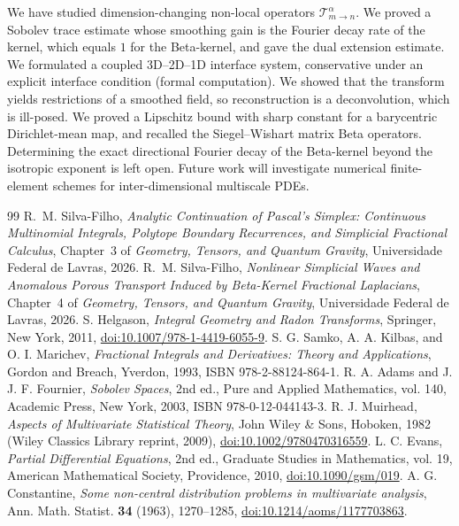 \documentclass[11pt,a4paper]{article}
\theoremstyle{plain}
\theoremstyle{definition}
\theoremstyle{remark}
\numberwithin{equation}{section}
\begin{document}
We have studied dimension-changing non-local operators $\mathcal{T}_{m \to n}^\alpha$. We proved a Sobolev trace estimate whose smoothing gain is the Fourier decay rate of the kernel, which equals $1$ for the Beta-kernel, and gave the dual extension estimate. We formulated a coupled 3D--2D--1D interface system, conservative under an explicit interface condition (formal computation). We showed that the transform yields restrictions of a smoothed field, so reconstruction is a deconvolution, which is ill-posed. We proved a Lipschitz bound with sharp constant for a barycentric Dirichlet-mean map, and recalled the Siegel--Wishart matrix Beta operators. Determining the exact directional Fourier decay of the Beta-kernel beyond the isotropic exponent is left open. Future work will investigate numerical finite-element schemes for inter-dimensional multiscale PDEs.



\begin{thebibliography}{99}
 R.~M. Silva-Filho, \emph{Analytic Continuation of Pascal's Simplex: Continuous Multinomial Integrals, Polytope Boundary Recurrences, and Simplicial Fractional Calculus}, Chapter~3 of \emph{Geometry, Tensors, and Quantum Gravity}, Universidade Federal de Lavras, 2026.
 R.~M. Silva-Filho, \emph{Nonlinear Simplicial Waves and Anomalous Porous Transport Induced by Beta-Kernel Fractional Laplacians}, Chapter~4 of \emph{Geometry, Tensors, and Quantum Gravity}, Universidade Federal de Lavras, 2026.
 S. Helgason, \emph{Integral Geometry and Radon Transforms}, Springer, New York, 2011, \href{https://doi.org/10.1007/978-1-4419-6055-9}{doi:10.1007/978-1-4419-6055-9}.
 S. G. Samko, A. A. Kilbas, and O. I. Marichev, \emph{Fractional Integrals and Derivatives: Theory and Applications}, Gordon and Breach, Yverdon, 1993, ISBN 978-2-88124-864-1.
 R. A. Adams and J. J. F. Fournier, \emph{Sobolev Spaces}, 2nd ed., Pure and Applied Mathematics, vol. 140, Academic Press, New York, 2003, ISBN 978-0-12-044143-3.
 R. J. Muirhead, \emph{Aspects of Multivariate Statistical Theory}, John Wiley \& Sons, Hoboken, 1982 (Wiley Classics Library reprint, 2009), \href{https://doi.org/10.1002/9780470316559}{doi:10.1002/9780470316559}.
 L. C. Evans, \emph{Partial Differential Equations}, 2nd ed., Graduate Studies in Mathematics, vol. 19, American Mathematical Society, Providence, 2010, \href{https://doi.org/10.1090/gsm/019}{doi:10.1090/gsm/019}.
 A. G. Constantine, \emph{Some non-central distribution problems in multivariate analysis}, Ann. Math. Statist. \textbf{34} (1963), 1270--1285, \href{https://doi.org/10.1214/aoms/1177703863}{doi:10.1214/aoms/1177703863}.
\end{thebibliography}
\end{document}
